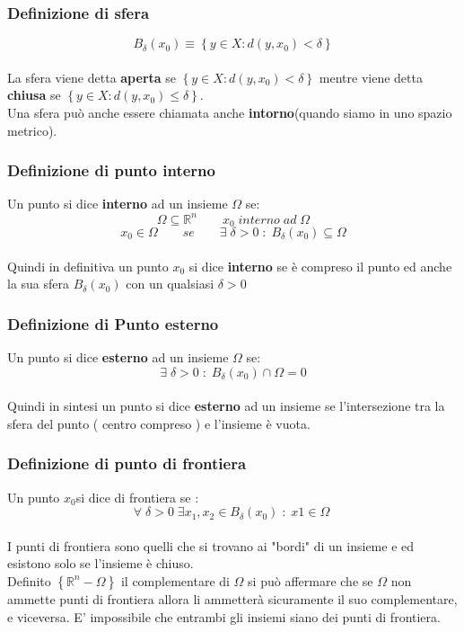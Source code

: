 \documentclass[fontsize = 20px, paper = a4]{article}
\begin{document}
\subsubsection{Definizione di sfera}
\hspace*{1cm}
$$B_\delta \left(x_0 \right) \equiv \left\{ y\in X : d \left( y,x_0\right )  < \delta  \right\}$$  \\
La sfera viene detta \textbf{aperta} se $\left\{ y\in X : d \left( y,x_0\right )  < \delta \right\}$ mentre viene detta \textbf{chiusa} se $\left\{ y\in X : d \left( y,x_0  \right ) \le \delta \right\}$.\\
Una sfera può anche essere  chiamata anche \textbf{intorno}(quando siamo in uno spazio metrico).
\subsubsection{Definizione di punto interno}
Un punto si dice \textbf{interno} ad un insieme $\Omega$ se: \\
$$\Omega \subseteq \mathbb{R}^n \qquad x_0 \; interno \; ad \; \Omega$$
$$x_0 \in \Omega \qquad se \qquad \exists \; \delta > 0 \; : \; B_\delta(x_0) \subseteq \Omega$$ \\
Quindi in definitiva un punto $x_0$ si dice \textbf{interno} se è compreso il punto ed anche la sua sfera $B_\delta(x_0)$ con un qualsiasi $\delta > 0$
\subsubsection{Definizione di Punto esterno}
Un punto si dice \textbf{esterno} ad un insieme $\Omega $ se:
$$\exists \; \delta > 0 \; : \;  B_\delta(x_0) \cap \Omega = 0$$ \\
Quindi in sintesi un punto si dice \textbf{esterno} ad un insieme se l'intersezione tra la sfera del punto ( centro compreso ) e l'insieme è vuota.
\subsubsection{Definizione di punto di frontiera}
Un punto $x_0$si dice di frontiera se :
$$\forall \; \delta >0 \; \exists x_1,x_2 \in B_\delta(x_0) \; : \; x1 \in \Omega \; $$ \\
I punti di frontiera sono quelli che si trovano ai "bordi" di un insieme e ed esistono solo se l'insieme è chiuso. \\
Definito $\left \{ \mathbb{R}^n - \Omega \right \}$ il complementare di $\Omega$ si può affermare che se $\Omega$ non ammette punti di frontiera allora li ammetterà sicuramente il suo complementare, e viceversa. E' impossibile che entrambi gli insiemi siano dei punti di frontiera.
\end{document}
